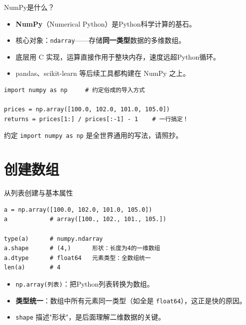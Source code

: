 \documentclass[9pt]{ctexbeamer}
\begin{document}
\begin{frame}[fragile]{NumPy是什么？}
	\begin{itemize}
		\item \textbf{NumPy}（Numerical Python）是Python科学计算的基石。
		\item 核心对象：\texttt{ndarray}——存储\textbf{同一类型}数据的多维数组。
		\item 底层用 C 实现，运算直接作用于整块内存，速度远超Python循环。
		\item pandas、scikit-learn 等后续工具都构建在 NumPy 之上。
	\end{itemize}
	\begin{lstlisting}
import numpy as np     # 约定俗成的导入方式

prices = np.array([100.0, 102.0, 101.0, 105.0])
returns = prices[1:] / prices[:-1] - 1    # 一行搞定！
\end{lstlisting}
	\begin{exampleblock}{约定}
		\texttt{import numpy as np} 是全世界通用的写法，请照抄。
	\end{exampleblock}
\end{frame}


\section{创建数组}

\begin{frame}[fragile]{从列表创建与基本属性}
	\begin{lstlisting}
a = np.array([100.0, 102.0, 101.0, 105.0])
a            # array([100., 102., 101., 105.])

type(a)      # numpy.ndarray
a.shape      # (4,)      形状：长度为4的一维数组
a.dtype      # float64   元素类型：全数组统一
len(a)       # 4
\end{lstlisting}
	\begin{itemize}
		\item \texttt{np.array(列表)}：把Python列表转换为数组。
		\item \textbf{类型统一}：数组中所有元素同一类型（如全是 \texttt{float64}），这正是快的原因。
		\item \texttt{shape} 描述"形状"，是后面理解二维数据的关键。
	\end{itemize}
\end{frame}
\end{document}
